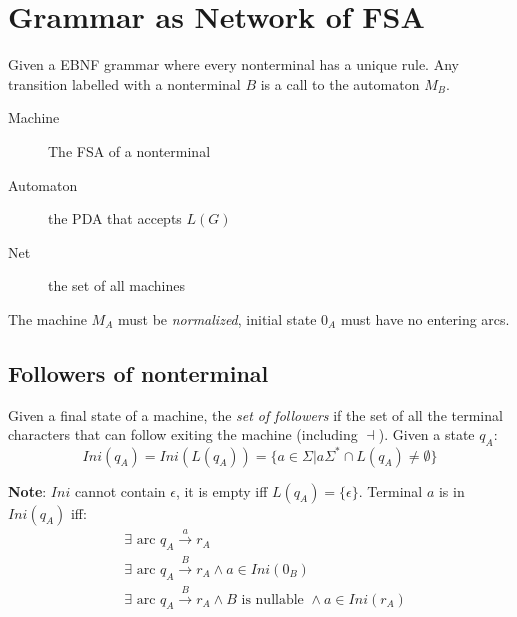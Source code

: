 \section{Grammar as Network of FSA}

Given a EBNF grammar where every nonterminal has a unique rule. Any transition labelled with a nonterminal $B$ is a call to the automaton $M_B$.

\begin{description}
    \item[Machine] The FSA of a nonterminal
    \item[Automaton] the PDA that accepts $L(G)$
    \item[Net] the set of all machines
\end{description}

The machine $M_A$ must be \emph{normalized}, initial state $0_A$ must have no entering arcs.

\subsection{Followers of nonterminal}
Given a final state of a machine, the \emph{set of followers} if the set of all the terminal characters that can follow exiting the machine (including $\dashv$). Given a state $q_A$:
\[
    Ini(q_A) = Ini(L(q_A)) = \{ a \in \Sigma | a\Sigma^* \cap L(q_A) \ne \emptyset \}
\]

\textbf{Note}: $Ini$ cannot contain $\epsilon$, it is empty iff $L(q_A)=\{\epsilon\}$.
Terminal $a$ is in $Ini(q_A)$ iff:
\begin{align*}
    & \exists \text{ arc } q_A \xrightarrow{a} r_A \\
    & \exists \text{ arc } q_A \xrightarrow{B} r_A \land a \in Ini(0_B) \\
    & \exists \text{ arc } q_A \xrightarrow{B} r_A \land B \text{ is nullable } \land a \in Ini(r_A)
\end{align*}
